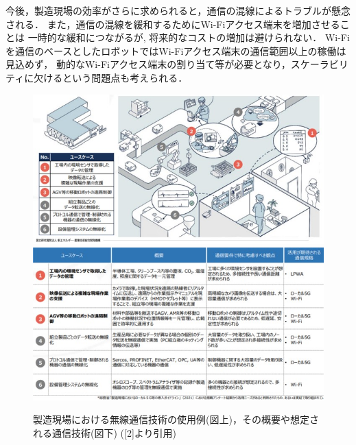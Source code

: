 \documentclass[main]{subfiles}
\begin{document}
    今後，製造現場の効率がさらに求められると，通信の混線によるトラブルが懸念される．
    また，通信の混線を緩和するためにWi-Fiアクセス端末を増加させることは
    一時的な緩和につながるが, 将来的なコストの増加は避けられない．
    Wi-Fiを通信のベースとしたロボットではWi-Fiアクセス端末の通信範囲以上の稼働は見込めず，
    動的なWi-Fiアクセス端末の割り当て等が必要となり，スケーラビリティに欠けるという問題点も考えられる．

    \begin{figure}[htbp]
        \centering
        \includegraphics[keepaspectratio, width=0.6\linewidth]{figures/first/1_2_image_left.jpg}
        \includegraphics[keepaspectratio, width=0.6\linewidth]{figures/first/1_2_image_right.jpg}
        \caption{製造現場における無線通信技術の使用例(図上)，その概要や想定される通信技術(図下) ([2]より引用)}
        \label{fig:label1-2}
    \end{figure}
\end{document}
